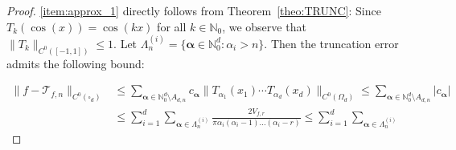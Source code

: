 \documentclass[10pt,a4paper]{amsart}
\begin{document}
\begin{proof}
\ref{item:approx_1} directly follows from Theorem~\ref{theo:TRUNC}:
Since \( T_k(\cos(x)) = \cos(kx) \) for all \( k \in \mathbb{N}_0 \), we observe that \( \|T_k\|_{C^0([-1,1])} \leq 1 \).
Let \(\Lambda_n^{(i)} = \{ \boldsymbol{\alpha} \in \mathbb{N}_{0}^d : \alpha_i > n \}\).
Then the truncation error admits the following bound:



\begin{align}
  \|f - \mathcal{T}_{f,n}\|_{C^0(\square_{d})}
  &\leq
  \sum_{\boldsymbol{\alpha} \in \mathbb{N}_{0}^d \setminus A_{d,n}} c_{\boldsymbol{\alpha}}\| T_{\alpha_1}(x_1)\cdots T_{\alpha_d}(x_d)\|_{C^0(\Omega_{d})}  \leq \sum_{\boldsymbol{\alpha} \in \mathbb{N}_{0}^d \setminus A_{d,n}} |c_{\boldsymbol{\alpha}}|\nonumber\\
  &\leq \sum_{i=1}^{d}  \sum_{\boldsymbol{\alpha} \in \Lambda_n^{(i)}}
\frac{2V_{f,r}}{ \pi \alpha_i(\alpha_i-1)\ldots(\alpha_i-r)}\leq \sum_{i=1}^{d}  \sum_{\boldsymbol{\alpha} \in \Lambda_n^{(i)}}

\end{align}
\end{proof}
\end{document}

